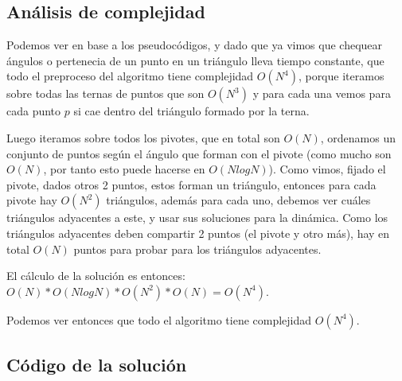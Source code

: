 \subsection{Análisis de complejidad}
Podemos ver en base a los pseudocódigos, y dado que ya vimos que chequear ángulos 
o pertenecia de un punto en un triángulo lleva tiempo constante, que todo el preproceso 
del algoritmo tiene complejidad $O(N^4)$, porque iteramos sobre todas las ternas de puntos que son 
$O(N^3)$ y para cada una vemos para cada punto $p$ si cae dentro del triángulo formado por la terna. 

Luego iteramos sobre todos los pivotes, que en total son $O(N)$, ordenamos un conjunto de puntos 
según el ángulo que forman con el pivote (como mucho son $O(N)$, por tanto esto puede hacerse 
en $O(N log N)$). Como vimos, fijado el pivote, dados otros 2 puntos, estos forman un triángulo, 
entonces para cada pivote hay $O(N^2)$ triángulos, además para cada uno, debemos ver cuáles triángulos 
adyacentes a este, y usar sus soluciones para la dinámica. Como los triángulos adyacentes deben compartir 
2 puntos (el pivote y otro más), hay en total $O(N)$ puntos para probar para los triángulos adyacentes. 

El cálculo de la solución es entonces: $O(N) * O(N log N) * O(N^2) * O(N) = O(N^4)$. 

Podemos ver entonces que todo el algoritmo tiene complejidad $O(N^4)$. 

\newpage
\subsection{Código de la solución}

